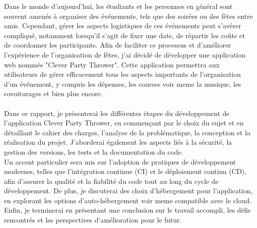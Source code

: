

Dans le monde d'aujourd'hui, les étudiants et les personnes en général sont souvent amenés à organiser des événements, tels que des soirées ou des fêtes entre amis.
Cependant, gérer les aspects logistiques de ces événements peut s'avérer compliqué, notamment lorsqu'il s'agit de fixer une date, de répartir les coûts et de coordonner les participants.
Afin de faciliter ce processus et d'améliorer l'expérience de l'organisation de fêtes, j'ai décidé de développer une application web nommée "Clever Party Thrower".
Cette application permettra aux utilisateurs de gérer efficacement tous les aspects importants de l'organisation d'un événement,
y compris les dépenses, les courses voir meme la musique, les covoiturages et bien plus encore.\\\\

Dans ce rapport, je présenterai les différentes étapes du développement de l'application Clever Party Thrower,
en commençant par le choix du sujet et en détaillant le cahier des charges, l'analyse de la problématique, la conception et la réalisation du projet.
J'aborderai également les aspects liés à la sécurité, la gestion des versions, les tests et la documentation du code.\\
Un accent particulier sera mis sur l'adoption de pratiques de développement modernes, telles que l'intégration continue (CI) et le déploiement continu (CD), afin d'assurer la qualité et la fiabilité du code tout au long du cycle de développement.
De plus, je discuterai des choix d'hébergement pour l'application, en explorant les options d'auto-hébergement voir meme compatible avec le cloud.\\

Enfin, je terminerai en présentant une conclusion sur le travail accompli, les défis rencontrés et les perspectives d'amélioration pour le futur.